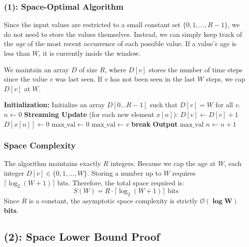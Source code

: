 \documentclass[11pt]{article}
\begin{document}
\subsubsection*{(1): Space-Optimal Algorithm}

Since the input values are restricted to a small constant set $\{0, 1, \dots, R-1\}$, we do not need to store the values themselves. Instead, we can simply keep track of the \textit{age} of the most recent occurrence of each possible value. If a value's age is less than $W$, it is currently inside the window.

We maintain an array $D$ of size $R$, where $D[v]$ stores the number of time steps since the value $v$ was last seen. If $v$ has not been seen in the last $W$ steps, we cap $D[v]$ at $W$.

\begin{algorithm}[H]
\caption{Space-Optimal Constant-Alphabet Sliding Max}
\begin{algorithmic}[1]
\State \textbf{Initialization:}
\State Initialize an array $D[0 \dots R-1]$ such that $D[v] = W$ for all $v$.
\State $n \gets 0$
\State \textbf{Streaming Update} (for each new element $x[n]$):
        \State $D[v] \gets D[v] + 1$ 
    \EndIf
\EndFor
\State $D[x[n]] \gets 0$ 
    \State $\text{max\_val} \gets 0$
     
            \State $\text{max\_val} \gets v$
            \State \textbf{break}
        \EndIf
    \EndFor
    \State \textbf{Output} $\text{max\_val}$
\EndIf
\State $n \gets n + 1$
\end{algorithmic}
\end{algorithm}

\subsubsection*{Space Complexity}
The algorithm maintains exactly $R$ integers. Because we cap the age at $W$, each integer $D[v] \in \{0, 1, \dots, W\}$. Storing a number up to $W$ requires $\lceil \log_2(W+1) \rceil$ bits. 
Therefore, the total space required is:
\[
S(W) = R \cdot \lceil \log_2(W+1) \rceil \text{ bits}
\]
Since $R$ is a constant, the asymptotic space complexity is strictly $\mathbf{\mathcal{O}(\log W)}$ \textbf{bits}.

\subsection*{(2): Space Lower Bound Proof}
\end{document}
